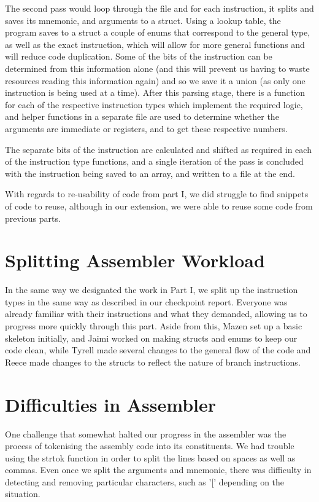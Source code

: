 \documentclass{article}
\begin{document}
The second pass would loop through the file and for each instruction, it splits and saves its mnemonic, and arguments to a struct. Using a lookup table, the program saves to a struct a couple of enums that correspond to the general type, as well as the exact instruction, which will allow for more general functions and will reduce code duplication. Some of the bits of the instruction can be determined from this information alone (and this will prevent us having to waste resources reading this information again) and so we save it a union (as only one instruction is being used at a time). After this parsing stage, there is a function for each of the respective instruction types which implement the required logic, and helper functions in a separate file are used to determine whether the arguments are immediate or registers, and to get these respective numbers. 

The separate bits of the instruction are calculated and shifted as required in each of the instruction type functions, and a single iteration of the pass is concluded with the instruction being saved to an array, and written to a file at the end.

With regards to re-usability of code from part I, we did struggle to find snippets of code to reuse, although in our extension, we were able to reuse some code from previous parts.

\section{Splitting Assembler Workload}
In the same way we designated the work in Part I, we split up the instruction types in the same way as described in our checkpoint report. Everyone was already familiar with their instructions and what they demanded, allowing us to progress more quickly through this part. Aside from this, Mazen set up a basic skeleton initially, and Jaimi worked on making structs and enums to keep our code clean, while Tyrell made several changes to the general flow of the code and Reece made changes to the structs to reflect the nature of branch instructions.

\section{Difficulties in Assembler}
One challenge that somewhat halted our progress in the assembler was the process of tokenising the assembly code into its constituents. We had trouble using the strtok function in order to split the lines based on spaces as well as commas. Even once we split the arguments and mnemonic, there was difficulty in detecting and removing particular characters, such as '[' depending on the situation.
\end{document}
